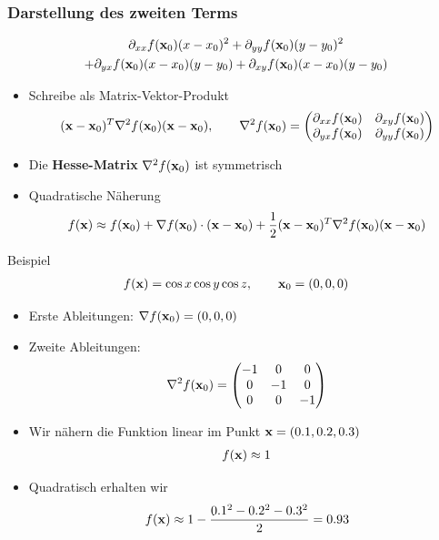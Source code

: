 \begin{frame}
  \frametitle<presentation>{Darstellung des zweiten Terms}
  \begin{multline*}
    \partial_{xx}f(\mathbf{x}_0)(x-x_0)^2+\partial_{yy}f(\mathbf{x}_0)(y-y_0)^2\\
    +\partial_{yx}f(\mathbf{x}_0)(x-x_0)(y-y_0)
    +\partial_{xy}f(\mathbf{x}_0)(x-x_0)(y-y_0)
  \end{multline*}
  \begin{itemize}
  \item Schreibe als Matrix-Vektor-Produkt
    \begin{gather*}
      (\mathbf{x}-\mathbf{x}_0)^T \nabla^2f(\mathbf{x}_0)(\mathbf{x}-\mathbf{x}_0),
      \qquad
      \nabla^2f(\mathbf{x}_0) =
      \begin{pmatrix}
        \partial_{xx}f(\mathbf{x}_0)&\partial_{xy}f(\mathbf{x}_0)\\
        \partial_{yx}f(\mathbf{x}_0)&\partial_{yy}f(\mathbf{x}_0)
      \end{pmatrix}
    \end{gather*}
  \item Die \textbf{Hesse-Matrix} $\nabla^2f(\mathbf{x}_0)$ ist symmetrisch
  \item<2-> Quadratische Näherung
    \begin{gather*}
      f(\mathbf{x}) \approx f(\mathbf{x}_0) + \nabla f(\mathbf{x}_0)\cdot(\mathbf{x}-\mathbf{x}_0)
      +\frac12 (\mathbf{x}-\mathbf{x}_0)^T \nabla^2f(\mathbf{x}_0)(\mathbf{x}-\mathbf{x}_0)
    \end{gather*}
  \end{itemize}
\end{frame}


\begin{frame}{Beispiel}
  \begin{gather*}
    f(\mathbf{x}) = \cos x\cos y\cos z,
    \qquad \mathbf{x}_0 = (0,0,0)
  \end{gather*}
  \begin{itemize}
  \item Erste Ableitungen: $\nabla f(\mathbf{x}_0) = (0,0,0)$
  \item Zweite Ableitungen:
    \begin{gather*}
      \nabla^2 f(\mathbf{x}_0) =
      \begin{pmatrix}
        -1 & 0 & 0\\
        0 & -1 & 0\\
        0 & 0 & -1
      \end{pmatrix}
    \end{gather*}
  \item Wir nähern die Funktion linear im Punkt $\mathbf{x}=(0.1,0.2,0.3)$
    \begin{gather*}
      f(\mathbf{x}) \approx 1
    \end{gather*}
  \item Quadratisch erhalten wir
    \begin{gather*}
      f(\mathbf{x}) \approx 1- \frac{0.1^2-0.2^2-0.3^2}{2} = 0.93
    \end{gather*}
  \end{itemize}
\end{frame}

